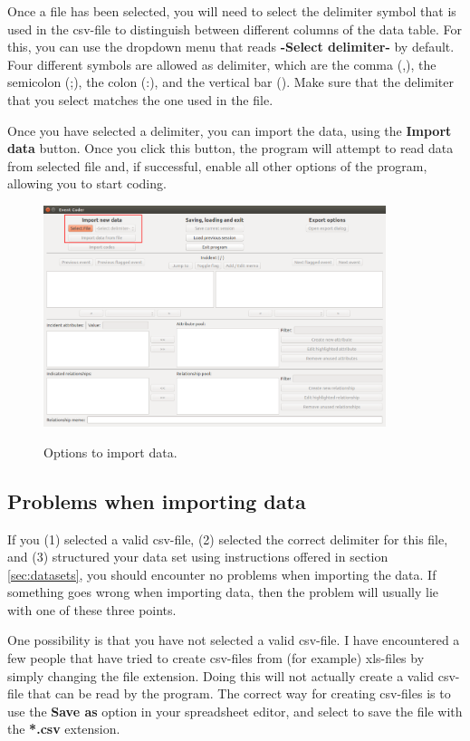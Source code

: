 \documentclass{memoir}
\begin{document}
Once a file has been selected, you will need to select the delimiter symbol that is used in the csv-file to distinguish between different columns of the data table. For this, you can use the dropdown menu that reads \textbf{-Select delimiter-} by default. Four different symbols are allowed as delimiter, which are the comma (,), the semicolon (;), the colon (:), and the vertical bar (\textbar). Make sure that the delimiter that you select matches the one used in the file.

Once you have selected a delimiter, you can import the data, using the \textbf{Import data} button. Once you click this button, the program will attempt to read data from selected file and, if successful, enable all other options of the program, allowing you to start coding.   

\begin{figure}[h!]
  \centering
  \caption{Options to import data.}
  \includegraphics[width=100mm]{Screenshot_0.pdf}
  \label{fig:importoptions}
\end{figure}

\subsection{Problems when importing data}
\label{sec:importerrors}

If you (1) selected a valid csv-file, (2) selected the correct delimiter for this file, and (3) structured your data set using instructions offered in section \ref{sec:datasets}, you should encounter no problems when importing the data. If something goes wrong when importing data, then the problem will usually lie with one of these three points.

One possibility is that you have not selected a valid csv-file. I have encountered a few people that have tried to create csv-files from (for example) xls-files by simply changing the file extension. Doing this will not actually create a valid csv-file that can be read by the program. The correct way for creating csv-files is to use the \textbf{Save as} option in your spreadsheet editor, and select to save the file with the \textbf{*.csv} extension.
\end{document}
